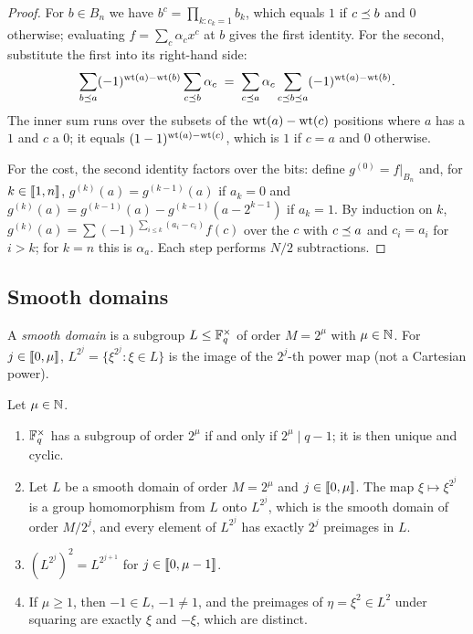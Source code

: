 \begin{proof}
For $b \in B_n$ we have $b^c = \prod_{k : c_k = 1} b_k$, which equals $1$ if $c \preceq b$ and $0$ otherwise; evaluating $f = \sum_c \alpha_c x^c$ at $b$ gives the first identity.
For the second, substitute the first into its right-hand side:
\[
  \sum_{b \preceq a} (-1)^{\mathrm{wt}(a)-\mathrm{wt}(b)} \sum_{c \preceq b} \alpha_c
  \;=\; \sum_{c \preceq a} \alpha_c \sum_{c \preceq b \preceq a} (-1)^{\mathrm{wt}(a)-\mathrm{wt}(b)} .
\]
The inner sum runs over the subsets of the $\mathrm{wt}(a) - \mathrm{wt}(c)$ positions where $a$ has a $1$ and $c$ a $0$; it equals $(1-1)^{\mathrm{wt}(a)-\mathrm{wt}(c)}$, which is $1$ if $c = a$ and $0$ otherwise.

For the cost, the second identity factors over the bits: define $g^{(0)} = f|_{B_n}$ and, for $k \in \llbracket 1, n \rrbracket$, $g^{(k)}(a) = g^{(k-1)}(a)$ if $a_k = 0$ and $g^{(k)}(a) = g^{(k-1)}(a) - g^{(k-1)}(a - 2^{k-1})$ if $a_k = 1$. By induction on $k$, $g^{(k)}(a) = \sum (-1)^{\sum_{i \le k}(a_i - c_i)} f(c)$ over the $c$ with $c \preceq a$ and $c_i = a_i$ for $i > k$; for $k = n$ this is $\alpha_a$. Each step performs $N/2$ subtractions.
\end{proof}

\subsection{Smooth domains}\label{sec:prelim:domains}

\begin{definition}\label{def:domain}
A \emph{smooth domain} is a subgroup $L \le \mathbb{F}_q^{\times}$ of order $M = 2^{\mu}$ with $\mu \in \mathbb{N}$.
For $j \in \llbracket 0, \mu \rrbracket$, $L^{2^j} = \{\xi^{2^j} : \xi \in L\}$ is the image of the $2^j$-th power map (not a Cartesian power).
\end{definition}

\begin{lemma}\label{lem:power}
Let $\mu \in \mathbb{N}$.
\begin{enumerate}
  \item $\mathbb{F}_q^\times$ has a subgroup of order $2^\mu$ if and only if $2^\mu \mid q-1$; it is then unique and cyclic.
  \item Let $L$ be a smooth domain of order $M = 2^\mu$ and $j \in \llbracket 0, \mu \rrbracket$. The map $\xi \mapsto \xi^{2^j}$ is a group homomorphism from $L$ onto $L^{2^j}$, which is the smooth domain of order $M/2^j$, and every element of $L^{2^j}$ has exactly $2^j$ preimages in $L$.
  \item $(L^{2^j})^{2} = L^{2^{j+1}}$ for $j \in \llbracket 0, \mu-1 \rrbracket$.
  \item If $\mu \ge 1$, then $-1 \in L$, $-1 \ne 1$, and the preimages of $\eta = \xi^2 \in L^2$ under squaring are exactly $\xi$ and $-\xi$, which are distinct.
\end{enumerate}
\end{lemma}

